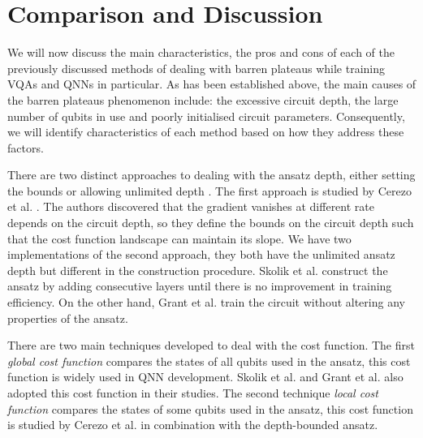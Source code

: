 \section{Comparison and Discussion}
We will now discuss the main characteristics, the pros and cons of each of the previously discussed methods of dealing with barren plateaus while training VQAs and QNNs in particular.
As has been established above, the main causes of the barren plateaus phenomenon include: the excessive circuit depth, the large number of qubits in use and poorly initialised circuit parameters.
Consequently, we will identify characteristics of each method based on how they address these factors.

There are two distinct approaches to dealing with the ansatz depth, either setting the bounds \cite{cerezoCostFunctionDependent2021} or allowing unlimited depth \cite{skolikLayerwiseLearningQuantum2021, grantInitializationStrategyAddressing2019}.
The first approach is studied by Cerezo et al. \cite{cerezoCostFunctionDependent2021}.
The authors discovered that the gradient vanishes at different rate depends on the circuit depth, so they define the bounds on the circuit depth such that the cost function landscape can maintain its slope.
We have two implementations of the second approach, they both have the unlimited ansatz depth but different in the construction procedure.
Skolik et al. \cite{skolikLayerwiseLearningQuantum2021} construct the ansatz by adding consecutive layers until there is no improvement in training efficiency.
On the other hand, Grant et al. \cite{grantInitializationStrategyAddressing2019} train the circuit without altering any properties of the ansatz.

There are two main techniques developed to deal with the cost function.
The first \emph{global cost function} compares the states of all qubits used in the ansatz, this cost function is widely used in QNN development.
Skolik et al. and Grant et al. also adopted this cost function in their studies.
The second technique \emph{local cost function} compares the states of some qubits used in the ansatz, this cost function is studied by Cerezo et al. \cite{cerezoCostFunctionDependent2021} in combination with the depth-bounded ansatz.

